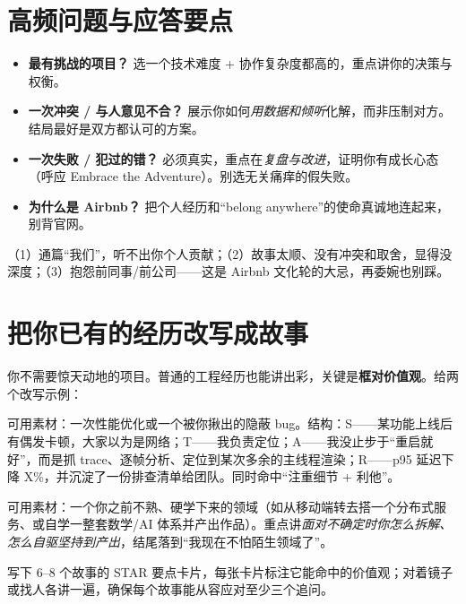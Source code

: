 \section{高频问题与应答要点}

\begin{itemize}
  \item \textbf{最有挑战的项目？} 选一个技术难度 + 协作复杂度都高的，重点讲你的决策与权衡。
  \item \textbf{一次冲突 / 与人意见不合？} 展示你如何\emph{用数据和倾听}化解，而非压制对方。结局最好是双方都认可的方案。
  \item \textbf{一次失败 / 犯过的错？} 必须真实，重点在\emph{复盘与改进}，证明你有成长心态（呼应 Embrace the Adventure）。别选无关痛痒的假失败。
  \item \textbf{为什么是 Airbnb？} 把个人经历和“belong anywhere”的使命真诚地连起来，别背官网。
\end{itemize}

\begin{pitfall}[行为面三个致命伤]
（1）通篇“我们”，听不出你个人贡献；（2）故事太顺、没有冲突和取舍，显得没深度；（3）抱怨前同事/前公司——这是 Airbnb 文化轮的大忌，再委婉也别踩。
\end{pitfall}

\section{把你已有的经历改写成故事}

你不需要惊天动地的项目。普通的工程经历也能讲出彩，关键是\textbf{框对价值观}。给两个改写示例：

\begin{followup}
可用素材：一次性能优化或一个被你揪出的隐蔽 bug。结构：S——某功能上线后有偶发卡顿，大家以为是网络；T——我负责定位；A——我没止步于“重启就好”，而是抓 trace、逐帧分析、定位到某次多余的主线程渲染；R——p95 延迟下降 X\%，并沉淀了一份排查清单给团队。同时命中“注重细节 + 利他”。
\end{followup}

\begin{followup}
可用素材：一个你之前不熟、硬学下来的领域（如从移动端转去搭一个分布式服务、或自学一整套数学/AI 体系并产出作品）。重点讲\emph{面对不确定时你怎么拆解、怎么自驱坚持到产出}，结尾落到“我现在不怕陌生领域了”。
\end{followup}

\begin{keypoint}[准备清单]
写下 6--8 个故事的 STAR 要点卡片，每张卡片标注它能命中的价值观；对着镜子或找人各讲一遍，确保每个故事能从容应对至少三个追问。
\end{keypoint}
